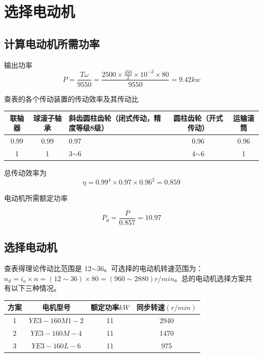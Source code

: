 \section{选择电动机}

\subsection{计算电动机所需功率}
输出功率
\begin{equation}
    P= \frac{T\omega}{9550}=\frac{2500 \times \frac{450}{2} \times 10^{-3} \times 80}{9550} = 9.42kw
\end{equation}

查表的各个传动装置的传动效率及其传动比

\begin{tabular}{|c|c|p{12em}|c|c|}
    \hline
    联轴器 & 球滚子轴承 & 斜齿圆柱齿轮（闭式传动，精度等级8级） & 圆柱齿轮（开式传动） & 运输滚筒 \\
    \hline
    0.99   & 0.99       & 0.97                                  & 0.96                 & 0.96     \\
    \hline
    1      & 1          & 3$\sim$6                              & 4$\sim$6             & 1        \\
    \hline
\end{tabular}

总传动效率为
\begin{equation}
    \eta = 0.99^4 \times 0.97 \times 0.96^2 = 0.859
\end{equation}

电动机所需额定功率

\begin{equation}
    P_d = \frac{P}{0.857} = 10.97
\end{equation}

\subsection{选择电动机}
查表得理论传动比范围是 12$\sim$36。可选择的电动机转速范围为：$n_d = i_a \times n = (12 \sim 36)\times 80=(960 \sim 2880)r/min$。总的电动机选择方案共有以下三种情况。

\begin{tabular}{|c|c|c|c|}
    \hline
    方案 & 电机型号      & 额定功率$kW$ & 同步转速$(r/min)$ \\
    \hline
    1    & $YE3-160M1-2$ & 11           & 2940              \\
    \hline
    2    & $YE3-160M-4$  & 11           & 1470              \\
    \hline
    3    & $YE3-160L-6$  & 11           & 975               \\
    \hline
\end{tabular}

